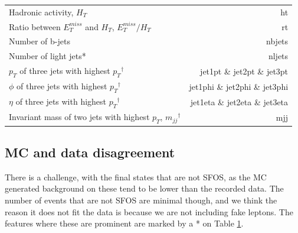 \documentclass[12pt, a4paper]{book}
\begin{document}
\begin{table}[!h]
\begin{tabular}{l|r}
        Hadronic activity, $H_T$                                                        & ht\\
        Ratio between $E_T^{miss}$ and $H_T$, $E_T^{miss}/H_T$                          & rt\\
        Number of b-jets                                                                & nbjets         \\
        Number of light jets*                                                           & nljets         \\
        $p_T$ of three jets with highest $p_T$$^\dagger$                                & jet1pt \& jet2pt \& jet3pt\\
        $\phi$ of three jets with highest $p_T$$^\dagger$                               & jet1phi \& jet2phi \& jet3phi\\
        $\eta$ of three jets with highest $p_T$$^\dagger$                               & jet1eta \& jet2eta \& jet3eta\\
        Invariant mass of two jets with highest $p_T$, $m_{jj}$$^\dagger$               & mjj\\\midrule\midrule
    \end{tabular}
    \label{tab:variables}
\end{table}

\subsection{MC and data disagreement} 
There is a challenge, with the final states that are not SFOS, as the MC generated background on these tend to be lower than the recorded data. The number of events that are not SFOS are minimal though, 
and we think the reason it does not fit the data is because we are not including fake leptons. The features where these are prominent are marked by a * on Table \ref{tab:variables}.
\end{document}
